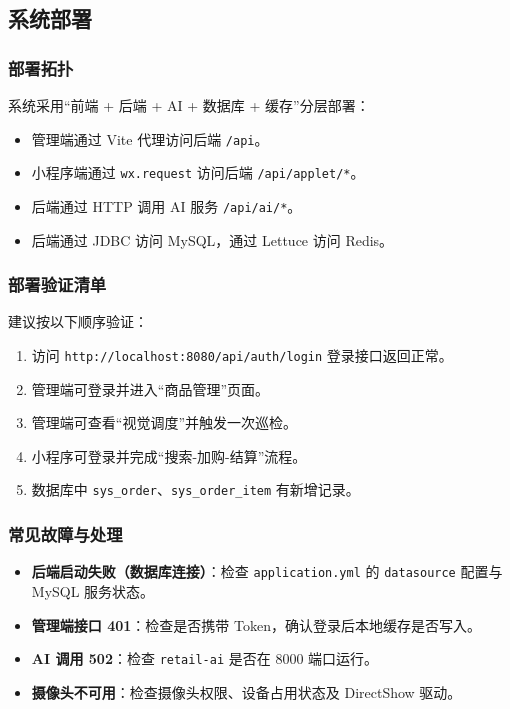 \subsection{系统部署}

\subsubsection{部署拓扑}
系统采用“前端 + 后端 + AI + 数据库 + 缓存”分层部署：
\begin{itemize}[leftmargin=2em]
  \item 管理端通过 Vite 代理访问后端 \texttt{/api}。
  \item 小程序端通过 \texttt{wx.request} 访问后端 \texttt{/api/applet/*}。
  \item 后端通过 HTTP 调用 AI 服务 \texttt{/api/ai/*}。
  \item 后端通过 JDBC 访问 MySQL，通过 Lettuce 访问 Redis。
\end{itemize}

\subsubsection{部署验证清单}
建议按以下顺序验证：
\begin{enumerate}[leftmargin=2em]
  \item 访问 \texttt{http://localhost:8080/api/auth/login} 登录接口返回正常。
  \item 管理端可登录并进入“商品管理”页面。
  \item 管理端可查看“视觉调度”并触发一次巡检。
  \item 小程序可登录并完成“搜索-加购-结算”流程。
  \item 数据库中 \texttt{sys\_order}、\texttt{sys\_order\_item} 有新增记录。
\end{enumerate}

\subsubsection{常见故障与处理}
\begin{itemize}[leftmargin=2em]
  \item \textbf{后端启动失败（数据库连接）}：检查 \texttt{application.yml} 的 \texttt{datasource} 配置与 MySQL 服务状态。
  \item \textbf{管理端接口 401}：检查是否携带 Token，确认登录后本地缓存是否写入。
  \item \textbf{AI 调用 502}：检查 \texttt{retail-ai} 是否在 8000 端口运行。
  \item \textbf{摄像头不可用}：检查摄像头权限、设备占用状态及 DirectShow 驱动。
\end{itemize}
